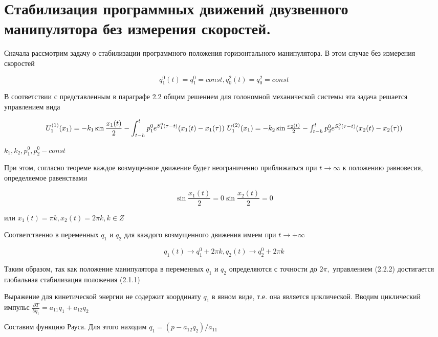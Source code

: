 \section{Стабилизация программных движений двузвенного манипулятора без измерения скоростей.} \label{p22}

Сначала рассмотрим задачу о стабилизации программного положения горизонтального манипулятора. В этом случае без измерения скоростей 

\begin{equation}
q^0_1 (t) = q^0_1 = const, q^2_0 (t) = q^2_0 = const
\end{equation}

В соответствии с представленным в параграфе 2.2 общим решением для голономной механической системы эта задача решается управлением вида 

\begin{equation}
U^{(1)}_1 (x_1) = - k_1 \sin \frac{x_1(t)}{2} - \int_{t-h}^t p_1^0 e^{S_1^0 (\tau - t)} (x_1 (t) - x_1 (\tau))$ $U^{(2)}_1 (x_1) = - k_2 \sin \frac{x_2(t)}{2} - \int_{t-h}^t p_2^0 e^{S_2^0 (\tau - t)} (x_2 (t) - x_2 (\tau))
\end{equation}

$k_1, k_2, p_1^0, p_2^0 - const$

При этом, согласно теореме каждое возмущенное движение будет неограниченно приближаться при $t \to \infty$ к положению равновесия, определяемое равенствами 

$$\sin \frac{x_1(t)}{2} = 0 \sin \frac{x_2(t)}{2} = 0$$

или $x_1(t) = \pi k, x_2(t) = 2 \pi k, k \in Z$

Соответственно в переменных $q_1$ и $q_2$ для каждого возмущенного движения имеем при $t \to +\infty$ 

\begin{equation}
q_1 (t) \to q_1^0 + 2 \pi k, q_2(t) \to q_2^0 + 2 \pi k
\end{equation}


Таким образом, так как положение манипулятора в переменных $q_1$ и $q_2$ определяются с точности до $2 \pi,$ управлением (2.2.2) достигается глобальная стабилизация положения (2.1.1)

Выражение для кинетической энергии не содержит координату $q_1$ в явном виде, т.е. она является циклической. Вводим циклический импульс $\frac{\partial T}{\partial \dot q_1} = a_{11} \dot q_1 + a_{12} \dot q_2$

Составим функцию Рауса. Для этого находим $\dot q_1 = (p - a_12 \dot q_2) / a_{11}$

